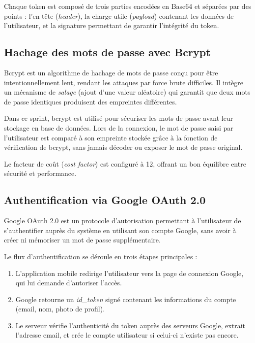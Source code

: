 Chaque token est composé de trois parties encodées en Base64 et séparées par des points : l'en-tête (\textit{header}), la charge utile (\textit{payload}) contenant les données de l'utilisateur, et la signature permettant de garantir l'intégrité du token.

\subsection{Hachage des mots de passe avec Bcrypt}

Bcrypt \cite{bcrypt} est un algorithme de hachage de mots de passe conçu pour être intentionnellement lent, rendant les attaques par force brute difficiles. Il intègre un mécanisme de \textit{salage} (ajout d'une valeur aléatoire) qui garantit que deux mots de passe identiques produisent des empreintes différentes.

Dans ce sprint, bcrypt est utilisé pour sécuriser les mots de passe avant leur stockage en base de données. Lors de la connexion, le mot de passe saisi par l'utilisateur est comparé à son empreinte stockée grâce à la fonction de vérification de bcrypt, sans jamais décoder ou exposer le mot de passe original.

Le facteur de coût (\textit{cost factor}) est configuré à 12, offrant un bon équilibre entre sécurité et performance.

\subsection{Authentification via Google OAuth 2.0}

Google OAuth 2.0 est un protocole d'autorisation permettant à l'utilisateur de s'authentifier auprès du système en utilisant son compte Google, sans avoir à créer ni mémoriser un mot de passe supplémentaire.

Le flux d'authentification se déroule en trois étapes principales :
\begin{enumerate}
    \item L'application mobile redirige l'utilisateur vers la page de connexion Google, qui lui demande d'autoriser l'accès.
    \item Google retourne un \textit{id\_token} signé contenant les informations du compte (email, nom, photo de profil).
    \item Le serveur vérifie l'authenticité du token auprès des serveurs Google, extrait l'adresse email, et crée le compte utilisateur si celui-ci n'existe pas encore.
\end{enumerate}

